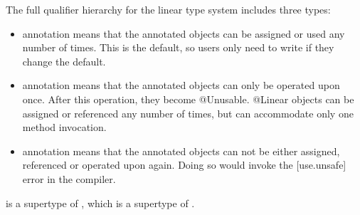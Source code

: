 The full qualifier hierarchy for the linear type system includes three
types:

\begin{itemize}
\item
{} annotation means that the annotated objects can be assigned or used any number of times.  This is the default, so users only
need to write  if they change the default.
\item
{} annotation means that the annotated objects can only be operated upon once. After this operation, they become @Unusable.
@Linear objects can be assigned or referenced any number of times, but can accommodate only one method invocation.
\item
{} annotation means that the annotated objects can not be either assigned, referenced or operated upon again.
Doing so would invoke the [use.unsafe] error in the compiler.
\end{itemize}

\noindent
{} is a supertype of , which is a
supertype of .


